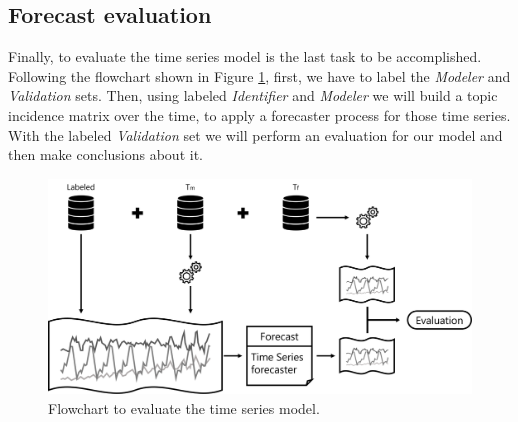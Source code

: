 \subsection{Forecast evaluation}

Finally, to evaluate the time series model is the last task to be accomplished. Following the flowchart shown in Figure \ref{fig:forecast}, first, we have to label the \textit{Modeler} and \textit{Validation} sets. Then, using labeled \textit{Identifier} and \textit{Modeler} we will build a topic incidence matrix over the time, to apply a forecaster process for those time series. With the labeled \textit{Validation} set we will perform an evaluation for our model and then make conclusions about it.

\begin{figure}[h!]
	\centering
	\includegraphics[width=\linewidth]{01.Chapters/04.Materials/forecast}
	\caption{Flowchart to evaluate the time series model.}
	\label{fig:forecast}
\end{figure}
